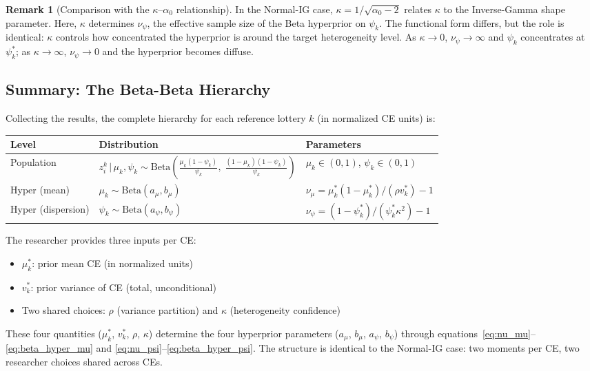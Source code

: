 \documentclass[11pt,a4paper]{article}
\theoremstyle{definition}
\newtheorem{remark}[theorem]{Remark}
\newcommand{\given}{\,|\,}
\begin{document}
\begin{remark}[Comparison with the $\kappa$--$\alpha_0$ relationship]
In the Normal-IG case, $\kappa = 1/\sqrt{\alpha_0 - 2}$ relates $\kappa$ to
the Inverse-Gamma shape parameter. Here, $\kappa$ determines $\nu_\psi$, the
effective sample size of the Beta hyperprior on $\psi_k$. The functional form
differs, but the role is identical: $\kappa$ controls how concentrated the
hyperprior is around the target heterogeneity level. As $\kappa \to 0$,
$\nu_\psi \to \infty$ and $\psi_k$ concentrates at $\psi_k^*$; as
$\kappa \to \infty$, $\nu_\psi \to 0$ and the hyperprior becomes diffuse.
\end{remark}

\subsection{Summary: The Beta-Beta Hierarchy}

Collecting the results, the complete hierarchy for each reference lottery $k$
(in normalized CE units) is:

\begin{center}
\begin{tabular}{lll}
\toprule
\textbf{Level} & \textbf{Distribution} & \textbf{Parameters} \\
\midrule
Population &
    $z_i^k \given \mu_k, \psi_k \sim
    \mathrm{Beta}\!\left(\frac{\mu_k(1-\psi_k)}{\psi_k},\;
    \frac{(1-\mu_k)(1-\psi_k)}{\psi_k}\right)$ &
    $\mu_k \in (0,1)$, $\psi_k \in (0,1)$ \\[8pt]
Hyper (mean) &
    $\mu_k \sim \mathrm{Beta}(a_\mu, b_\mu)$ &
    $\nu_\mu = \mu_k^*(1-\mu_k^*)/(\rho v_k^*) - 1$ \\[4pt]
Hyper (dispersion) &
    $\psi_k \sim \mathrm{Beta}(a_\psi, b_\psi)$ &
    $\nu_\psi = (1-\psi_k^*)/(\psi_k^* \kappa^2) - 1$ \\
\bottomrule
\end{tabular}
\end{center}

\noindent
The researcher provides three inputs per CE:
\begin{itemize}
    \item $\mu_k^*$: prior mean CE (in normalized units)
    \item $v_k^*$: prior variance of CE (total, unconditional)
    \item Two shared choices: $\rho$ (variance partition) and $\kappa$
    (heterogeneity confidence)
\end{itemize}
These four quantities ($\mu_k^*$, $v_k^*$, $\rho$, $\kappa$) determine the
four hyperprior parameters ($a_\mu$, $b_\mu$, $a_\psi$, $b_\psi$) through
equations~\eqref{eq:nu_mu}--\eqref{eq:beta_hyper_mu} and
\eqref{eq:nu_psi}--\eqref{eq:beta_hyper_psi}. The structure is identical to
the Normal-IG case: two moments per CE, two researcher choices shared across
CEs.
\end{document}
